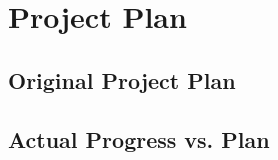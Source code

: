 \chapter{Project Plan}
\label{app:project_plan}


\section{Original Project Plan}

\section{Actual Progress vs. Plan}
